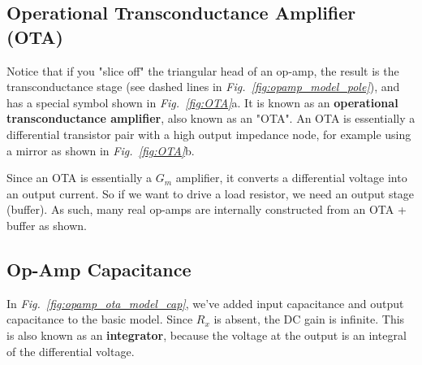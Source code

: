 \subsection{Operational Transconductance Amplifier (OTA)}
Notice that if you "slice off" the triangular head of an op-amp, the result is the transconductance stage (see dashed lines in \emph{Fig.~\ref{fig:opamp_model_pole}}), and has a special symbol shown in \emph{Fig.~\ref{fig:OTA}}a.  It is known as an \textbf{operational transconductance amplifier}, also known as an "OTA".  An OTA is essentially a differential transistor pair with a high output impedance node, for example using a mirror as shown in \emph{Fig.~\ref{fig:OTA}}b.

Since an OTA is essentially a $G_m$ amplifier, it converts a differential voltage into an output current.  So if we want to drive a load resistor, we need an output stage (buffer).  As such, many real op-amps are internally constructed from an OTA + buffer as shown.
\subsection{Op-Amp Capacitance}
In \emph{Fig.~\ref{fig:opamp_ota_model_cap}}, we've added input capacitance and output capacitance to the basic model.  Since $R_x$ is absent, the DC gain is infinite.  This is also known as an \textbf{integrator}, because the voltage at the output is an integral of the differential voltage.    


